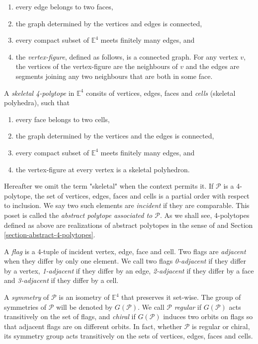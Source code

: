 \documentclass{amsart}
\begin{document}
\begin{enumerate}
\item every edge belongs to two faces, \item the
graph determined by the vertices and edges is connected, \item every compact
subset of $\mathbb{E}^4$ meets finitely many edges, and \item the
\textit{vertex-figure}, defined as follows, is a connected graph. For any vertex
$v$, the vertices of the vertex-figure are the neighbours of $v$ and the edges
are segments joining any two neighbours that are both in some face.
\end{enumerate}
    
A \textit{skeletal 4-polytope} in $\mathbb{E}^4$ consits of vertices, edges,
faces and \textit{cells} (skeletal polyhedra), such that
    
\begin{enumerate}
\item every face belongs to two cells,
\item the graph determined by the vertices and the edges is connected,
\item every compact subset of $\mathbb{E}^4$ meets finitely many edges, and
\item the vertex-figure at every vertex is a skeletal polyhedron.
\end{enumerate}
	
Hereafter we omit the term "skeletal" when the context permits it. If
$\mathcal{P}$ is a 4-polytope, the set of vertices, edges, faces and cells is a
partial order with respect to inclusion. We say two such elements are
\textit{incident} if they are comparable. This poset is called the
\textit{abstract polytope associated to $\mathcal{P}$}. As we shall see,
4-polytopes defined as above are realizations of abstract polytopes in the sense
of \cite{ARP} and Section \ref{section-abstract-4-polytopes}.
	
A \textit{flag} is a 4-tuple of incident vertex, edge, face and cell. Two flags
are \textit{adjacent} when they differ by only one element. We call two flags
\textit{0-adjacent} if they differ by a vertex, \textit{1-adjacent} if they
differ by an edge, \textit{2-adjacent} if they differ by a face and
\textit{3-adjacent} if they differ by a cell.
	
A \textit{symmetry} of $\mathcal{P}$ is an isometry of $\mathbb{E}^4$ that
preserves it set-wise. The group of symmetries of $\mathcal{P}$ will be denoted
by $G(\mathcal{P})$. We call $\mathcal{P}$ \textit{regular} if $G(\mathcal{P})$
acts transitively on the set of flags, and \textit{chiral} if $G(\mathcal{P})$
induces two orbits on flags so that adjacent flags are on different orbits. In
fact, whether $\mathcal{P}$ is regular or chiral, its symmetry group acts
transitively on the sets of vertices, edges, faces and cells.
	
\end{document}
